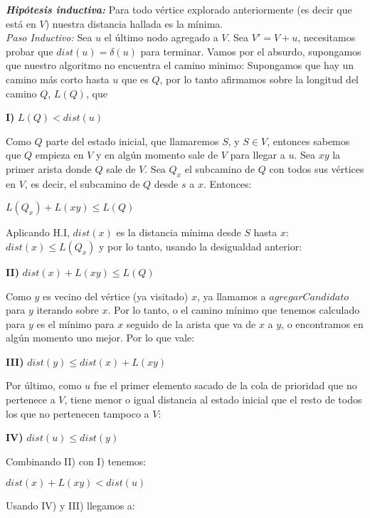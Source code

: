 \emph{\textbf{Hipótesis inductiva: }} Para todo vértice explorado anteriormente (es decir que está en $V$) nuestra distancia hallada es la mínima.
\\

\emph{Paso Inductivo:} Sea $u$ el último nodo agregado a $V$. Sea $V'= V + u$, necesitamos probar que $dist(u) = \delta(u)$ para terminar. Vamos por el absurdo, supongamos que nuestro algoritmo no encuentra el camino minimo: Supongamos que hay un camino más corto hasta $u$ que es $Q$, por lo tanto afirmamos sobre la longitud del camino $Q$, $L(Q)$, que
\\
\begin{center}
\textbf{I)} $L(Q) < dist(u)$
\\
\end{center}
Como $Q$ parte del estado inicial, que llamaremos $S$, y $S \in V$, entonces sabemos que $Q$ empieza en $V$ y en algún momento sale de $V$ para llegar a $u$. Sea $xy$ la primer arista donde $Q$ sale de $V$. Sea $Q_x$ el subcamino de $Q$ con todos sus vértices en $V$, es decir, el subcamino de $Q$ desde $s$ a $x$. Entonces:
\\
\begin{center}
$L(Q_x)+L(xy) \leq L(Q)$
\\
\end{center}
Aplicando H.I, $dist(x)$ es la distancia mínima desde $S$ hasta $x$: $dist(x) \leq L(Q_x)$ y por lo tanto, usando la desigualdad anterior:
\\
\begin{center}
\textbf{II)} $dist(x)+L(xy) \leq L(Q) $
\\
\end{center}
Como $y$ es vecino del vértice (ya visitado) $x$, ya llamamos a $agregarCandidato$ para $y$ iterando sobre $x$. Por lo tanto, o el camino mínimo que tenemos calculado para $y$ es el mínimo para $x$ seguido de la arista que va de $x$ a $y$, o encontramos en algún momento uno mejor. Por lo que vale:
\\
\begin{center}
\textbf{III)} $dist(y) \leq dist(x) + L(xy)$
\\
\end{center}
Por último, como $u$ fue el primer elemento sacado de la cola de prioridad que no pertenece a $V$, tiene menor o igual distancia al estado inicial que el resto de todos los que no pertenecen tampoco a $V$:
\\
\begin{center}
\textbf{IV)} $dist(u) \le dist(y) $
\\
\end{center}
Combinando II) con I) tenemos:
\\
\begin{center}
$dist(x)+L(xy) < dist(u)$
\\
\end{center}
Usando IV) y III) llegamos a:
\\

